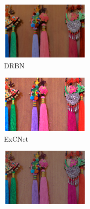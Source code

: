 \documentclass[letterpaper,12pt]{article}
\begin{document}
\begin{figure}[htbp]
\begin{subfigure}{0.18\textwidth}
			\includegraphics[width=\linewidth]{LOL-test_dataset/DRBN}
			\captionsetup{font=scriptsize}
			\caption{DRBN}
			\label{fig: LOL-test_k}  
		\end{subfigure}    
		\begin{subfigure}{0.18\textwidth}
			\includegraphics[width=\linewidth]{LOL-test_dataset/ExCNet}
			\captionsetup{font=scriptsize}
			\caption{ExCNet}
			\label{fig: LOL-test_l}
		\end{subfigure}
		\begin{subfigure}{0.18\textwidth}
			\includegraphics[width=\linewidth]{LOL-test_dataset/Zero-DCE}

\end{subfigure}
\end{figure}
\end{document}
